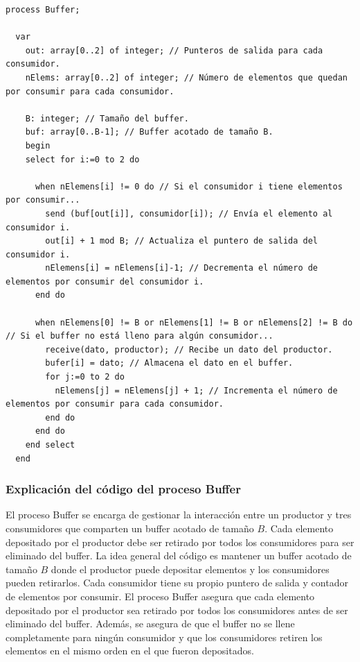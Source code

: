\documentclass[a4paper,12pt]{article}
\begin{document}
\begin{lstlisting}[style=customcpp, caption={Pseudocódigo del proceso Buffer}]
  process Buffer;

  var
    out: array[0..2] of integer; // Punteros de salida para cada consumidor.
    nElems: array[0..2] of integer; // Número de elementos que quedan por consumir para cada consumidor.
    
    B: integer; // Tamaño del buffer.
    buf: array[0..B-1]; // Buffer acotado de tamaño B.
    begin
    select for i:=0 to 2 do 
      
      when nElemens[i] != 0 do // Si el consumidor i tiene elementos por consumir...
        send (buf[out[i]], consumidor[i]); // Envía el elemento al consumidor i.
        out[i] + 1 mod B; // Actualiza el puntero de salida del consumidor i.
        nElemens[i] = nElemens[i]-1; // Decrementa el número de elementos por consumir del consumidor i.
      end do
      
      when nElemens[0] != B or nElemens[1] != B or nElemens[2] != B do // Si el buffer no está lleno para algún consumidor...
        receive(dato, productor); // Recibe un dato del productor.
        bufer[i] = dato; // Almacena el dato en el buffer.
        for j:=0 to 2 do
          nElemens[j] = nElemens[j] + 1; // Incrementa el número de elementos por consumir para cada consumidor.
        end do
      end do
    end select
  end
\end{lstlisting}

\subsubsection*{Explicación del código del proceso Buffer}

El proceso Buffer se encarga de gestionar la interacción entre un productor y tres consumidores que comparten un buffer acotado de tamaño \( B \). Cada elemento depositado por el productor debe ser retirado por todos los consumidores para ser eliminado del buffer.
La idea general del código es mantener un buffer acotado de tamaño \( B \) donde el productor puede depositar elementos y los consumidores pueden retirarlos. Cada consumidor tiene su propio puntero de salida y contador de elementos por consumir. El proceso Buffer asegura que cada elemento depositado por el productor sea retirado por todos los consumidores antes de ser eliminado del buffer. Además, se asegura de que el buffer no se llene completamente para ningún consumidor y que los consumidores retiren los elementos en el mismo orden en el que fueron depositados.
\end{document}
